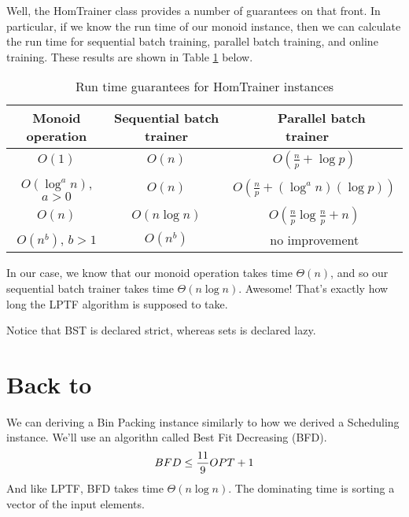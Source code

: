 \documentclass[tikz]{tmr}
\newcommand{\prob}[1]{{\sc {#1}}}
\newcommand\+{\mdoubleplus}
\begin{document}
Well, the HomTrainer class provides a number of guarantees on that front.
In particular, if we know the run time of our monoid instance, then we can calculate the run time for sequential batch training, parallel batch training, and online training.
These results are shown in Table \ref{table:rt} below.

\begin{table}[H]
\caption{Run time guarantees for HomTrainer instances}
\label{table:rt}
\centering
\begin{tabular}{ c | c | c}
\hline
Monoid operation & Sequential batch trainer & \ \ Parallel batch trainer\ \ \\
\hline \hline
$O(1)$ & $O(n)$ & $O\left(\frac{n}{p}+\log p\right)$\\
$O(\log^a n)$, $a>0$ & $O(n)$ & $O\left(\frac{n}{p}+(\log^a n)(\log p)\right)$\\
$O(n)$ & $O(n\log n)$ & $O\left(\frac{n}{p}\log\frac{n}{p}+n\right)$\\
$O(n^b)$, $b>1$ & $O(n^b)$ & no improvement\\
\hline
\end{tabular}
\end{table}

In our case, we know that our monoid operation takes time $\Theta(n)$, and so our sequential batch trainer takes time $\Theta(n\log n)$.
Awesome!
That's exactly how long the LPTF algorithm is supposed to take.

Notice that BST is declared strict, whereas sets is declared lazy.

\section{Back to \prob{Bin Packing}}

We can deriving a Bin Packing instance similarly to how we derived a Scheduling instance.
We'll use an algorithn called Best Fit Decreasing (BFD).
$$
BFD \le {11\over9}OPT + 1
$$
And like LPTF, BFD takes time $\Theta(n\log n)$.
The dominating time is sorting a vector of the input elements.
\end{document}
